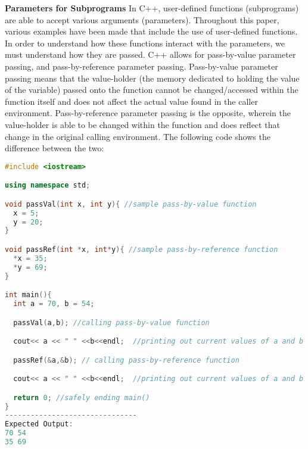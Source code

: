 \documentclass[12pt]{article}
\begin{document}
\textbf{Parameters for Subprograms} In C++, user-defined functions (subprograms) are able to accept various arguments (parameters). Throughout this paper, various examples have been made that include the use of user-defined functions. In order to understand how these functions interact with the parameters, we must understand how they are passed. C++ allows for pass-by-value parameter passing, and pass-by-reference parameter passing. Pass-by-value parameter passing means that the value-holder (the memory dedicated to holding the value of the variable) passed onto the function cannot be changed/accessed within the function itself and does not affect the actual value found in the caller environment. Pass-by-reference parameter passing is the opposite, wherein the value-holder is able to be changed within the function and does reflect that change in the original calling environment. The following code shows the difference between the two:
\begin{lstlisting}[language=C++]
#include <iostream>

using namespace std;

void passVal(int x, int y){ //sample pass-by-value function
  x = 5;
  y = 20;
}

void passRef(int *x, int*y){ //sample pass-by-reference function
  *x = 35;
  *y = 69;
}

int main(){
  int a = 70, b = 54;

  passVal(a,b); //calling pass-by-value function

  cout<< a << " " <<b<<endl;  //printing out current values of a and b

  passRef(&a,&b); // calling pass-by-reference function

  cout<< a << " " <<b<<endl;  //printing out current values of a and b

  return 0; //safely ending main()
}
-------------------------------
Expected Output:
70 54
35 69
\end{lstlisting}
\end{document}
